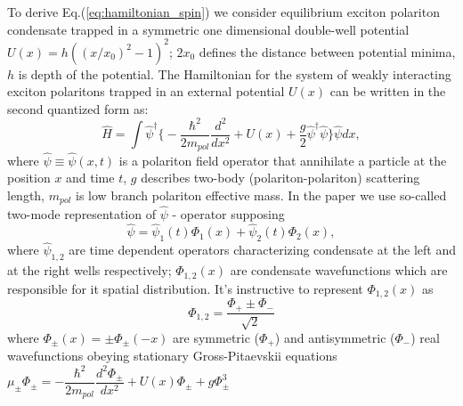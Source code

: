 \documentclass[aps, pre, preprint, groupedaddress, superscriptaddress, showkeys, showpacs] {revtex4-1}
\begin{document}
{{{To derive Eq.(\ref{eq:hamiltonian_spin}) we consider equilibrium exciton polariton condensate trapped in a symmetric one dimensional double-well potential $U(x) = h ((x/x_0)^2 - 1)^2$; $2x_0$ defines the distance between potential minima, $h$ is depth of the potential.
% 
%
The Hamiltonian for the system of weakly interacting exciton polaritons trapped in an external potential $U(x)$ can be written in the second quantized form as:
%
\begin{equation}
\hat{H} = \int \hat{\psi}^\dag\Big\{ -\dfrac{\hbar^2}{2m_{pol}}  \dfrac{d^2 }{dx^2} + U(x) + \dfrac{g}{2} \hat{\psi}^{\dag} \hat{\psi}  \Big\}\hat{\psi} dx,
\label{eq:gpe_hamiltonian}
\end{equation}
%
where $\hat{\psi} \equiv \hat{\psi}(x, t)$ is a polariton field operator that annihilate a particle at the position $x$ and time $t$, $g$ describes two-body (polariton-polariton) scattering length, $m_{pol}$ is low branch polariton effective mass.
In the paper we use so-called two-mode representation of $\hat{\psi}$ - operator supposing
%
\begin{equation}
\hat{\psi} = \hat{\psi}_1(t) \Phi_1(x) + \hat{\psi}_2(t) \Phi_2(x),
\label{eq:two_modes}
\end{equation}
%
where $\hat{\psi}_{1,2}$ are time dependent operators characterizing condensate at the left and at the right wells respectively; $\Phi_{1,2}(x)$ are condensate wavefunctions which are responsible for it spatial distribution.
It's instructive to represent  $\Phi_{1,2}(x)$ as
%
\begin{equation}
\Phi_{1,2} = \dfrac{\Phi_+ \pm \Phi_-}{\sqrt{2}}
\label{eq:basic_modes}
\end{equation}
%
where $\Phi_{\pm}(x) = \pm \Phi_{\pm}(-x)$ are symmetric ($\Phi_+$) and antisymmetric ($\Phi_-$) real wavefunctions obeying stationary Gross-Pitaevskii equations $\mu_{\pm} \Phi_{\pm} = -\dfrac{\hbar^2}{2m_{pol}} \dfrac{d^2 \Phi_{\pm}}{dx^2} + U(x) \Phi_{\pm} + g \Phi_{\pm}^3$
%
}}}
\end{document}
